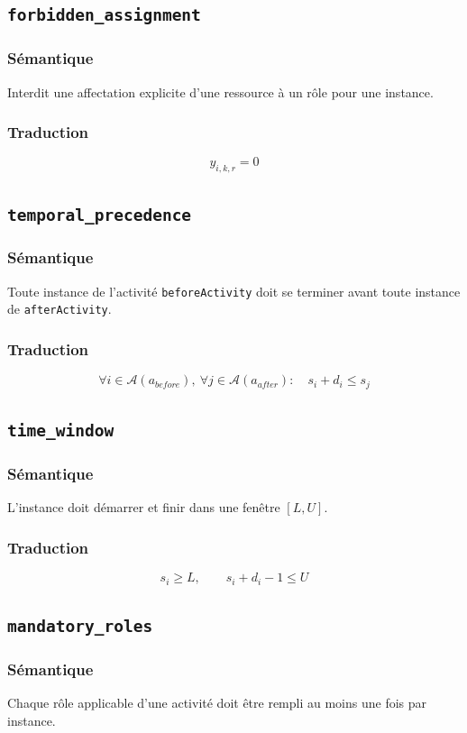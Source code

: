 \documentclass[12pt,a4paper]{article}
\begin{document}
\subsection{\texttt{forbidden\_assignment}}
\subsubsection*{Sémantique}
Interdit une affectation explicite d'une ressource à un rôle pour une instance.

\subsubsection*{Traduction}
\[
y_{i,k,r}=0
\]

\subsection{\texttt{temporal\_precedence}}
\subsubsection*{Sémantique}
Toute instance de l'activité \texttt{beforeActivity} doit se terminer avant toute instance de \texttt{afterActivity}.

\subsubsection*{Traduction}
\[
\forall i\in\mathcal{A}(a_{before}),\ \forall j\in\mathcal{A}(a_{after}):\quad s_i+d_i \le s_j
\]

\subsection{\texttt{time\_window}}
\subsubsection*{Sémantique}
L'instance doit démarrer et finir dans une fenêtre \([L,U]\).

\subsubsection*{Traduction}
\[
s_i \ge L,\qquad s_i+d_i-1 \le U
\]

\subsection{\texttt{mandatory\_roles}}
\subsubsection*{Sémantique}
Chaque rôle applicable d'une activité doit être rempli au moins une fois par instance.
\end{document}
